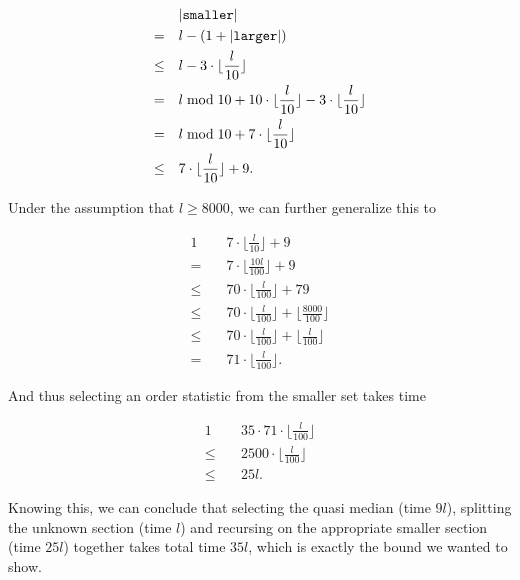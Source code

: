 \begin{alignat*}{1}
    &\quad \lvert\mathrm{\texttt{smaller}}\rvert \\
    =&\quad l - (1 + \lvert\mathrm{\texttt{larger}}\rvert) \\
    \leq&\quad l - 3 \cdot \lfloor \frac l {10} \rfloor \\
    =&\quad l \bmod 10 + 10 \cdot \lfloor \frac l {10} \rfloor - 3 \cdot \lfloor \frac l {10} \rfloor \\
    =&\quad l \bmod 10 + 7 \cdot \lfloor \frac l {10} \rfloor \\
    \leq&\quad 7 \cdot \lfloor \frac l {10} \rfloor + 9.
\end{alignat*}

Under the assumption that $l \geq 8000$, we can further generalize this to

\begin{alignat*}{1}
    &\quad 7 \cdot \lfloor \frac l {10} \rfloor + 9 \\
    =&\quad 7 \cdot \lfloor \frac {10l} {100} \rfloor + 9 \\
    \leq&\quad 70 \cdot \lfloor \frac {l} {100} \rfloor + 79 \\
    \leq&\quad 70 \cdot \lfloor \frac {l} {100} \rfloor + \lfloor \frac {8000} {100} \rfloor \\
    \leq&\quad 70 \cdot \lfloor \frac {l} {100} \rfloor + \lfloor \frac {l} {100} \rfloor \\
    =&\quad 71 \cdot \lfloor \frac {l} {100} \rfloor.
\end{alignat*}

And thus selecting an order statistic from the smaller set takes time

\begin{alignat*}{1}
    &\quad 35 \cdot 71 \cdot \lfloor \frac {l} {100} \rfloor \\
    \leq&\quad 2500 \cdot \lfloor \frac {l} {100} \rfloor \\
    \leq&\quad 25 l.
\end{alignat*}

Knowing this, we can conclude that selecting the quasi median (time $9l$), splitting the unknown section (time $l$) and recursing on the appropriate smaller section (time $25l$) together takes total time $35l$, which is exactly the bound we wanted to show.